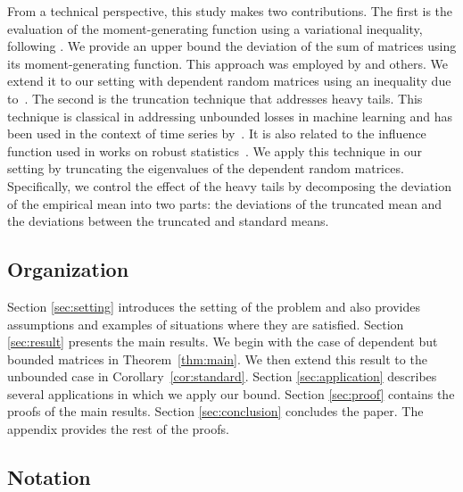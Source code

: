 \documentclass[11pt,a4paper]{article}
\theoremstyle{remark}
\theoremstyle{definition}
\theoremstyle{definition}
\newcommand{\rc}{\color{black}}
\begin{document}
\begin{bibunit}[apalike]
From a technical perspective, this study makes two contributions. 
The first is the evaluation of the moment-generating function using a variational inequality, following \citep{catoni2017dimension}. We {\rc provide an} upper bound the deviation of the sum of matrices using its moment-generating function. %
This approach was employed by \citep{zhivotovskiy2021dimension} and others. We extend it to our setting with dependent random matrices using an inequality {\rc due to}~\citep{rio2000inegalites}.
The second is the truncation technique that addresses heavy tails. This technique is classical in addressing unbounded losses in machine learning and has been used in the context of time series by~\cite{alquier2012model}.
It is also related to the influence function used in works on robust statistics~\citep{catoni2012challenging,catoni2017dimension,zhivotovskiy2021dimension,abdalla2022covariance}.
We apply this technique in our setting by truncating the eigenvalues of the dependent random matrices.
Specifically, we control the effect of the heavy tails by decomposing the deviation of the empirical mean into two parts: the deviations of the truncated mean and the deviations between the truncated and standard means.

\subsection{Organization}

Section \ref{sec:setting} introduces the setting of the problem and also provides assumptions and examples of situations where they are satisfied.
Section \ref{sec:result} presents the main results. We begin with the case of dependent but bounded matrices in Theorem~\ref{thm:main}. We then extend this result to the unbounded case in Corollary~\ref{cor:standard}.
Section \ref{sec:application} describes several applications in which we apply our bound.
Section \ref{sec:proof} contains the proofs of the main results.
Section \ref{sec:conclusion} concludes the paper.
The appendix provides the rest of the proofs.
%

\subsection{Notation}


\end{bibunit}
\end{document}
